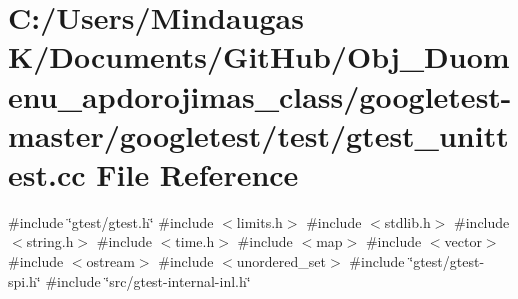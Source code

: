 \hypertarget{googletest-master_2googletest_2test_2gtest__unittest_8cc}{}\section{C\+:/\+Users/\+Mindaugas K/\+Documents/\+Git\+Hub/\+Obj\+\_\+\+Duomenu\+\_\+apdorojimas\+\_\+class/googletest-\/master/googletest/test/gtest\+\_\+unittest.cc File Reference}
\label{googletest-master_2googletest_2test_2gtest__unittest_8cc}
{\ttfamily \#include \char`\"{}gtest/gtest.\+h\char`\"{}}\newline
{\ttfamily \#include $<$limits.\+h$>$}\newline
{\ttfamily \#include $<$stdlib.\+h$>$}\newline
{\ttfamily \#include $<$string.\+h$>$}\newline
{\ttfamily \#include $<$time.\+h$>$}\newline
{\ttfamily \#include $<$map$>$}\newline
{\ttfamily \#include $<$vector$>$}\newline
{\ttfamily \#include $<$ostream$>$}\newline
{\ttfamily \#include $<$unordered\+\_\+set$>$}\newline
{\ttfamily \#include \char`\"{}gtest/gtest-\/spi.\+h\char`\"{}}\newline
{\ttfamily \#include \char`\"{}src/gtest-\/internal-\/inl.\+h\char`\"{}}\newline
